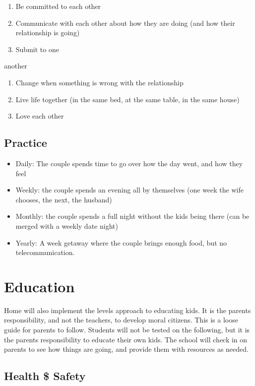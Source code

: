 \documentclass[CSHFoundation.tex]{subfiles}
\begin{document}
\begin{enumerate}
\item Be committed to each other
\item Communicate with each other about how they are doing (and how their relationship is going)
\item Submit to one 
\end{enumerate}another

\begin{enumerate}
\item Change when something is wrong with the relationship
\item Live life together (in the same bed, at the same table, in the same house)
\item Love each other
\end{enumerate}

\subsection{Practice}

\begin{itemize}
\item Daily: The couple spends time to go over how the day went, and how they feel
\item Weekly: the couple spends an evening all by themselves (one week the wife chooses, the next, the husband)
\item Monthly: the couple spends a full night without the kids being there (can be merged with a weekly date night)
\item Yearly: A week getaway where the couple brings enough food, but no telecommunication.
\end{itemize}

\section{Education}

Home will also implement the levels approach to educating kids. It is the parents responsibility, and not the teachers, to develop moral citizens. This is a loose guide for parents to follow. Students will not be tested on the following, but it is the parents responsibility to educate their own kids. The school will check in on parents to see how things are going, and provide them with resources as needed.



\subsection{Health \$ Safety}
\end{document}
